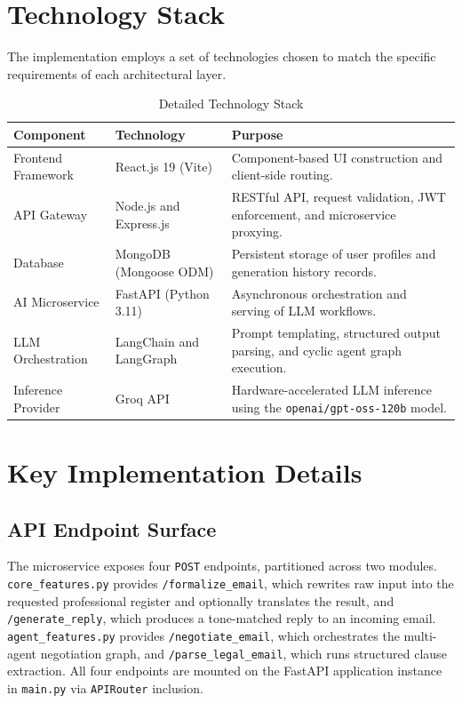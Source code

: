 \documentclass[12pt,a4paper]{report}
\begin{document}
\section{Technology Stack}
The implementation employs a set of technologies chosen to match the specific requirements of each architectural layer.

\begin{table}[ht]
	\centering
	\renewcommand{\arraystretch}{1.4}
	\begin{tabularx}{\textwidth}{llX}
		\toprule
		\textbf{Component} & \textbf{Technology}     & \textbf{Purpose}                                                                 \\
		\midrule
		Frontend Framework & React.js 19 (Vite)      & Component-based UI construction and client-side routing.                         \\
		API Gateway        & Node.js and Express.js  & RESTful API, request validation, JWT enforcement, and microservice proxying.     \\
		Database           & MongoDB (Mongoose ODM)  & Persistent storage of user profiles and generation history records.              \\
		AI Microservice    & FastAPI (Python 3.11)   & Asynchronous orchestration and serving of LLM workflows.                         \\
		LLM Orchestration  & LangChain and LangGraph & Prompt templating, structured output parsing, and cyclic agent graph execution.  \\
		Inference Provider & Groq API                & Hardware-accelerated LLM inference using the \texttt{openai/gpt-oss-120b} model. \\
		\bottomrule
	\end{tabularx}
	\caption{Detailed Technology Stack}
\end{table}

\section{Key Implementation Details}

\subsection{API Endpoint Surface}
The microservice exposes four \texttt{POST} endpoints, partitioned across two modules. \texttt{core\_features.py} provides \texttt{/formalize\_email}, which rewrites raw input into the requested professional register and optionally translates the result, and \texttt{/generate\_reply}, which produces a tone-matched reply to an incoming email. \texttt{agent\_features.py} provides \texttt{/negotiate\_email}, which orchestrates the multi-agent negotiation graph, and \texttt{/parse\_legal\_email}, which runs structured clause extraction. All four endpoints are mounted on the FastAPI application instance in \texttt{main.py} via \texttt{APIRouter} inclusion.
\end{document}
